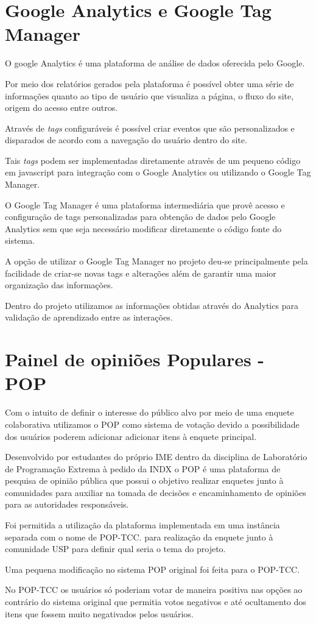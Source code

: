 \section{Google Analytics e Google Tag Manager}
\par O google Analytics é uma plataforma de análise de dados oferecida pelo Google.
\par Por meio dos relatórios gerados pela plataforma é possível obter uma série de informações quanto ao tipo de usuário que visualiza a página, o fluxo do site, origem do acesso entre outros.
\par Através de \emph{tags} configuráveis é possível criar eventos que são personalizados e disparados de acordo com a navegação do usuário dentro do site.
\par Tais \emph{tags} podem ser implementadas diretamente através de um pequeno código em javascript para integração com o Google Analytics ou utilizando o Google Tag Manager.
\par O Google Tag Manager é uma plataforma intermediária que provê acesso e configuração de tags personalizadas para obtenção de dados pelo Google Analytics sem que seja necessário modificar diretamente o código fonte do sistema.
\par A opção de utilizar o Google Tag Manager no projeto deu-se principalmente pela facilidade de criar-se novas tags e alterações além de garantir uma maior organização das informações.
\par Dentro do projeto utilizamos as informações obtidas através do Analytics para validação de aprendizado entre as interações.

\section{Painel de opiniões Populares - POP}
\par Com o intuito de definir o interesse do público alvo por meio de uma enquete colaborativa utilizamos o POP como sistema de votação devido a possibilidade dos usuários poderem adicionar adicionar itens à enquete principal.
\par Desenvolvido por estudantes do próprio IME dentro da disciplina de Laboratório de Programação Extrema à pedido da INDX o POP é uma plataforma de pesquisa de opinião pública que possui o objetivo realizar enquetes junto à comunidades para auxiliar na tomada de decisões e encaminhamento de opiniões para as autoridades responsáveis.
\par Foi permitida a utilização da plataforma implementada em uma instância separada com o nome de POP-TCC. para realização da enquete junto à comunidade USP para definir qual seria o tema do projeto.
\par Uma pequena modificação no sistema POP original foi feita para o POP-TCC.
\par No POP-TCC os usuários só poderiam votar de maneira positiva nas opções ao contrário do sistema original que permitia votos negativos e até ocultamento dos itens que fossem muito negativados pelos usuários.

